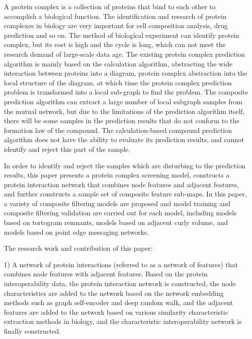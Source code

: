 
\begin{eabstract}
  A protein complex is a collection of proteins that bind to each other to accomplish a biological function. The identification and research of protein complexes in biology are very important for cell composition analysis, drug prediction and so on. The method of biological experiment can identify protein complex, but its cost is high and the cycle is long, which can not meet the research demand of large-scale data age.
  The existing protein complex prediction algorithm is mainly based on the calculation algorithm, abstracting the wide interaction between proteins into a diagram, protein complex abstraction into the local structure of the diagram, at which time the protein complex prediction problem is transformed into a local sub-graph to find the problem. The composite prediction algorithm can extract a large number of local subgraph samples from the mutual network, but due to the limitations of the prediction algorithm itself, there will be some samples in the prediction results that do not conform to the formation law of the compound. The calculation-based compound prediction algorithm does not have the ability to evaluate its prediction results, and cannot identify and reject this part of the sample.

  In order to identify and reject the samples which are disturbing to the prediction results, this paper presents a protein complex screening model, constructs a protein interaction network that combines node features and adjacent features, and further constructs a sample set of composite feature sub-maps. In this paper, a variety of composite filtering models are proposed and model training and composite filtering validation are carried out for each model, including models based on tortogram remnants, models based on adjacent curly volume, and models based on point edge messaging networks.

  The research work and contribution of this paper:

  1) A network of protein interactions (referred to as a network of features) that combines node features with adjacent features. Based on the protein interoperability data, the protein interaction network is constructed, the node characteristics are added to the network based on the network embedding methods such as graph self-encoder and deep random walk, and the adjacent features are added to the network based on various similarity characteristic extraction methods in biology, and the characteristic interoperability network is finally constructed.


\end{eabstract}
